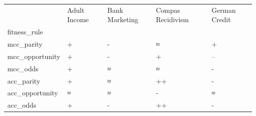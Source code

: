 \begin{tabular}{lllll}
\toprule
 & Adult Income & Bank Marketing & Compas Recidivism & German Credit \\
fitness_rule &  &  &  &  \\
\midrule
mcc_parity & + & - & ≈ & + \\
mcc_opportunity & + & - & + & -- \\
mcc_odds & + & ≈ & ≈ & - \\
acc_parity & + & ≈ & ++ & - \\
acc_opportunity & ≈ & ≈ & - & ≈ \\
acc_odds & + & - & ++ & - \\
\bottomrule
\end{tabular}
